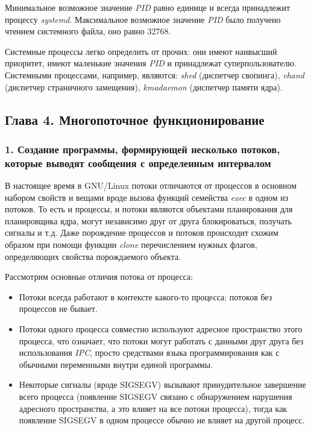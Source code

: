 \documentclass[14pt,a4paper,report]{report}
\begin{document}
Минимальное возможное значение \emph{PID} равно единице и всегда принадлежит процессу \emph{systemd}. Максимальное возможное значение \emph{PID} было получено чтением системного файла, оно равно 32768.

Системные процессы легко определить от прочих: они имеют наивысший приоритет, имеют маленькие значения \emph{PID} и  принадлежат суперпользователю. Системными процессами, например, являются: \emph{shed} (диспетчер свопинга), \emph{vhand} (диспетчер страничного замещения), \emph{kmadaemon} (диспетчер памяти ядра).

\subsection{Глава 4. Многопоточное функционирование}

\subsubsection{1. Создание программы, формирующей несколько потоков, которые выводят сообщения с определенным интервалом}

В настоящее время в GNU/Linux потоки отличаются от процессов в основном набором свойств и вещами вроде вызова функций семейства \emph{exec} в одном из потоков. То есть и процессы, и потоки являются объектами планирования для планировщика ядра, могут независимо друг от друга блокироваться, получать сигналы и т.д. Даже порождение процессов и потоков происходит схожим образом при помощи функции \emph{clone} перечислением нужных флагов, определяющих свойства порождаемого объекта.

Рассмотрим основные отличия потока от процесса:

\begin{itemize}
	\item Потоки всегда работают в контексте какого-то процесса: потоков без процессов не бывает.
	\item Потоки одного процесса совместно используют  адресное пространство этого процесса, что означает, что потоки могут работать с данными друг друга без использования \emph{IPC}, просто средствами языка программирования как с обычными переменными внутри единой программы.
	\item Некоторые сигналы (вроде SIGSEGV) вызывают принудительное завершение всего процесса (появление SIGSEGV связано с обнаружением нарушения адресного пространства, а это влияет на все потоки процесса), тогда как появление SIGSEGV в одном процессе обычно не влияет на другой процесс.
\end{itemize}
\end{document}
